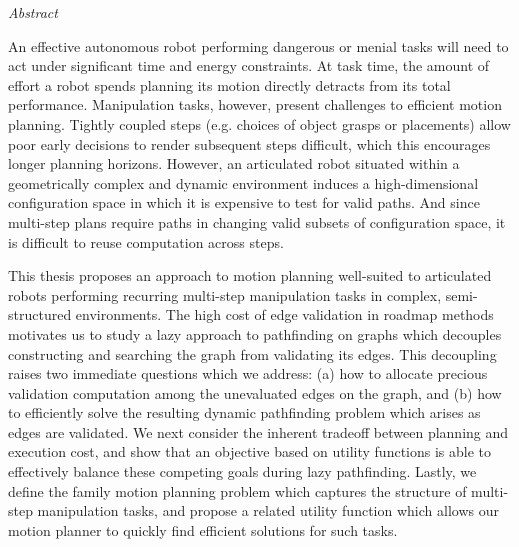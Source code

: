 
\begin{fullwidth}
\begin{adjustwidth}{1in}{1in}

\vphantom{.}

\vspace{0.2in}

{\LARGE \emph{Abstract}}

\vspace{0.2in}

An effective autonomous robot performing dangerous or menial tasks
will need to act under significant time and energy constraints.
At task time,
the amount of effort a robot spends planning its motion directly
detracts from its total performance.
Manipulation tasks, however, present challenges
to efficient motion planning.
Tightly coupled steps (e.g. choices of object grasps or placements)
allow poor early decisions to render subsequent steps difficult,
which this encourages longer planning horizons.
However,
an articulated robot
situated within a geometrically complex and dynamic environment
induces a high-dimensional configuration space
in which it is expensive to test for valid paths.
And since multi-step plans
require paths in changing valid subsets of configuration space,
it is difficult to reuse computation across steps.

\vspace{0.2cm}

This thesis proposes an approach to motion planning
well-suited to articulated robots
performing recurring multi-step manipulation tasks
in complex, semi-structured environments.
The high cost of edge validation in roadmap methods
motivates us to study a lazy approach to pathfinding on graphs
which decouples constructing and searching the graph
from validating its edges.
This decoupling raises two immediate questions which we address:
(a) how to allocate precious validation computation
among the unevaluated edges on the graph,
and (b) how to efficiently solve the resulting dynamic pathfinding
problem which arises as edges are validated.
We next consider the inherent tradeoff
between planning and execution cost,
and show that an objective based on utility functions
is able to effectively balance these competing goals
during lazy pathfinding.
Lastly,
we define the family motion planning problem
which captures the structure of multi-step manipulation tasks,
and propose a related utility function which allows our
motion planner to quickly find efficient solutions for such tasks.

\vspace{0.2cm}


\end{adjustwidth}
\end{fullwidth}
